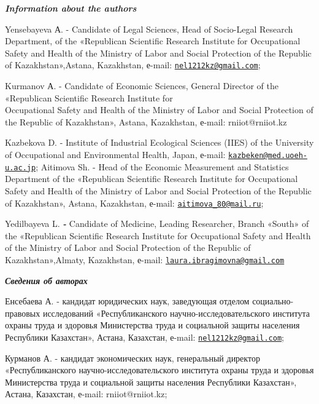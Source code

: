 \begin{authorinfo}
\emph{{\bfseries Information about the authors}}

Yensebayeva А. - Candidate of Legal Sciences, Head of Socio-Legal
Research Department, of the «Republican Scientific Research Institute
for Occupational Safety and Health of the Ministry of Labor and Social
Protection of the Republic of Kazakhstan»,Astana, Kazakhstan, е-mail:
\href{mailto:nel1212kz@gmail.com}{\nolinkurl{nel1212kz@gmail.com}};

Kurmanov А. - Candidate of Economic Sciences, General Director of the
«Republican Scientific Research Institute for \\Occupational Safety and
Health of the Ministry of Labor and Social Protection of the Republic of
Kazakhstan», Astana, Kazakhstan, е-mail: rniiot@rniiot.kz

Kazbekova D. - Institute of Industrial Ecological Sciences (IIES) of the
University of Occupational and Environmental Health, Japan, е-mail:
\href{mailto:kazbeken@med.uoeh-u.ac.jp}{\nolinkurl{kazbeken@med.uoeh-u.ac.jp}};
Aitimova Sh. - Head of the Economic Measurement and Statistics
Department of the «Republican Scientific Research Institute for
Occupational Safety and Health of the Ministry of Labor and Social
Protection of the Republic of Kazakhstan», Astana, Kazakhstan, е-mail:
\href{mailto:aitimova_80@mail.ru}{\nolinkurl{aitimova\_80@mail.ru}};

Yedilbayeva L. \emph{{\bfseries -}} Candidate of Medicine, Leading
Researcher, Branch «South» of the «Republican Scientific Research
Institute for Occupational Safety and Health of the Ministry of Labor
and Social Protection of the Republic of Kazakhstan»,Almaty, Kazakhstan,
е-mail:
\href{mailto:laura.ibragimovna@gmail.com}{\nolinkurl{laura.ibragimovna@gmail.com}}

\emph{{\bfseries Сведения об авторах}}

Енсебаева А. - кандидат юридических наук, заведующая отделом
социально-правовых исследований «Республиканского
научно-исследовательского института охраны труда и здоровья Министерства
труда и социальной защиты населения Республики Казахстан», Астана,
Казахстан, е-mail:
\href{mailto:nel1212kz@gmail.com}{\nolinkurl{nel1212kz@gmail.com}};

Курманов А. - кандидат экономических наук, генеральный директор
«Республиканского научно-исследовательского института охраны труда и
здоровья Министерства труда и социальной защиты населения Республики
Казахстан», Астана, Казахстан, е-mail: rniiot@rniiot.kz;


\end{authorinfo}
